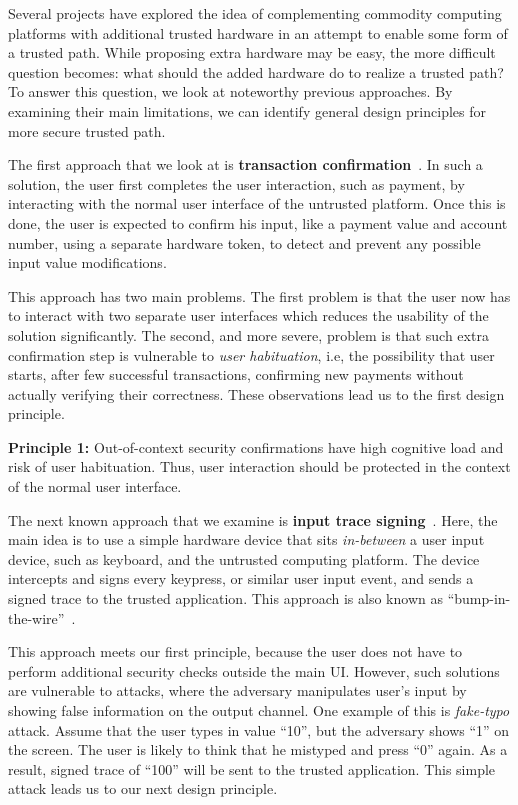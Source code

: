 Several projects have explored the idea of complementing commodity computing platforms with additional trusted hardware in an attempt to enable some form of a trusted path. While proposing extra hardware may be easy, the more difficult question becomes: what should the added hardware do to realize a trusted path? To answer this question, we look at noteworthy previous approaches. By examining their main limitations, we can identify general design principles for more secure trusted path.
	
The first approach that we look at is \textbf{transaction confirmation}~\cite{filyanov2011uni}. In such a solution, the user first completes the user interaction, such as payment, by interacting with the normal user interface of the untrusted platform. Once this is done, the user is expected to confirm his input, like a payment value and account number, using a separate hardware token, to detect and prevent any possible input value modifications.

This approach has two main problems. The first problem is that the user now has to interact with two separate user interfaces which reduces the usability of the solution significantly. The second, and more severe, problem is that such extra confirmation step is vulnerable to \emph{user habituation}, i.e, the possibility that user starts, after few successful transactions, confirming new payments without actually verifying their correctness. These observations lead us to the first design principle.  

\begin{tcolorbox}
\textbf{Principle 1:} Out-of-context security confirmations have high cognitive load and risk of user habituation. Thus, user interaction should be protected in the context of the normal user interface.
\end{tcolorbox}

The next known approach that we examine is \textbf{input trace signing}~\cite{IntegriKey}. Here, the main idea is to use a simple hardware device that sits \emph{in-between} a user input device, such as keyboard, and the untrusted computing platform. The device intercepts and signs every keypress, or similar user input event, and sends a signed trace to the trusted application. This approach is also known as ``bump-in-the-wire''~\cite{McCPerRei2006}. 

This approach meets our first principle, because the user does not have to perform additional security checks outside the main UI. However, such solutions are vulnerable to attacks, where the adversary manipulates user's input by showing false information on the output channel. One example of this is \emph{fake-typo} attack. Assume that the user types in value ``10'', but the adversary shows ``1'' on the screen. The user is likely to think that he mistyped and press ``0'' again. As a result, signed trace of ``100'' will be sent to the trusted application. This simple attack leads us to our next design principle.


